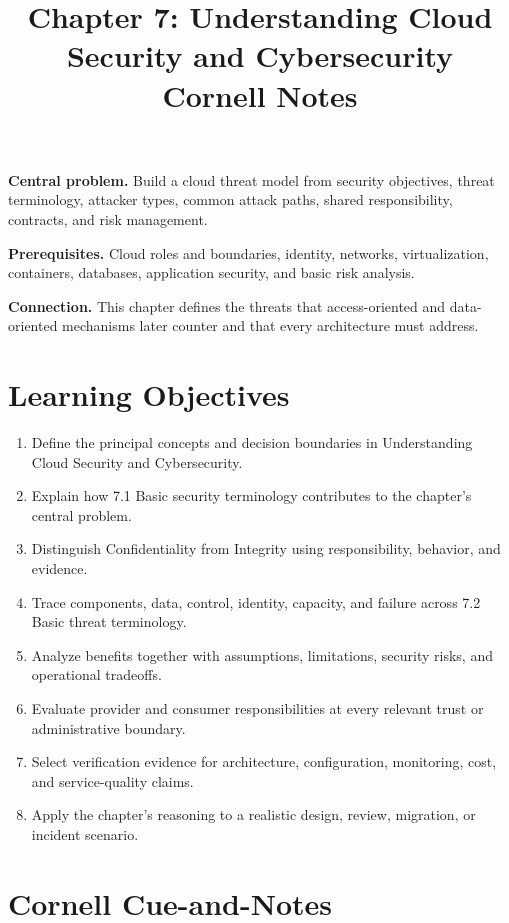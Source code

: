 \documentclass[11pt]{article}
\title{Chapter 7: Understanding Cloud Security and Cybersecurity\\[2mm]\large Cornell Notes}
\author{}
\date{}
\begin{document}
\maketitle
\thispagestyle{fancy}
\vspace{-1.5em}
\begin{orientationbox}
\textbf{Central problem.} Build a cloud threat model from security objectives, threat terminology, attacker types, common attack paths, shared responsibility, contracts, and risk management.\par\smallskip
\textbf{Prerequisites.} Cloud roles and boundaries, identity, networks, virtualization, containers, databases, application security, and basic risk analysis.\par\smallskip
\textbf{Connection.} This chapter defines the threats that access-oriented and data-oriented mechanisms later counter and that every architecture must address.
\end{orientationbox}
\section{Learning Objectives}
\begin{enumerate}
\item Define the principal concepts and decision boundaries in Understanding Cloud Security and Cybersecurity.
\item Explain how 7.1 Basic security terminology contributes to the chapter's central problem.
\item Distinguish Confidentiality from Integrity using responsibility, behavior, and evidence.
\item Trace components, data, control, identity, capacity, and failure across 7.2 Basic threat terminology.
\item Analyze benefits together with assumptions, limitations, security risks, and operational tradeoffs.
\item Evaluate provider and consumer responsibilities at every relevant trust or administrative boundary.
\item Select verification evidence for architecture, configuration, monitoring, cost, and service-quality claims.
\item Apply the chapter's reasoning to a realistic design, review, migration, or incident scenario.
\end{enumerate}
\section{Cornell Cue-and-Notes}
\end{document}
